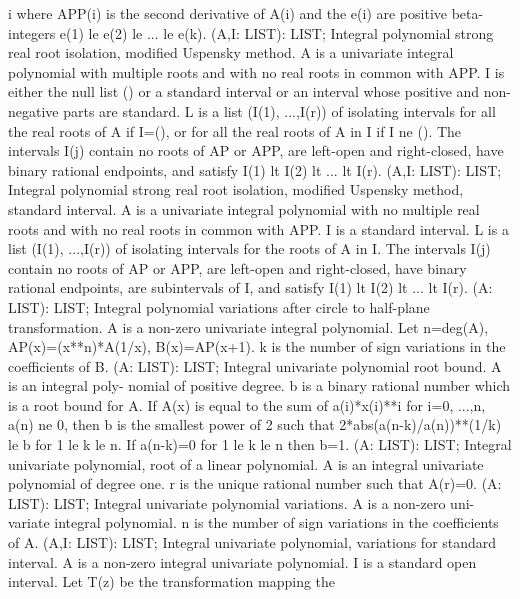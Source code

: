 i where APP(i) is the second derivative of A(i) and the e(i) are
positive beta-integers e(1) le e(2) le ... le e(k). \ecom 
{} (A,I: LIST): LIST; \eproc
\bcom Integral polynomial strong real root isolation, modified Uspensky method.
A is a univariate integral polynomial with multiple roots and
with no real roots in common with APP.  I is either the null list () or
a standard interval or an interval whose positive and non-negative
parts are standard.  L is a list (I(1), ...,I(r)) of isolating intervals
for  all the real roots of A if I=(), or for all the real roots of A in
I if I ne ().  The intervals I(j) contain no roots of AP or APP, are
left-open and right-closed, have binary rational endpoints, and
satisfy I(1) lt I(2) lt ... lt I(r). \ecom 
{} (A,I: LIST): LIST; \eproc
\bcom Integral polynomial strong real root isolation, modified Uspensky method, standard interval.
A is a univariate integral polynomial with no multiple real roots 
and with no real roots in common with APP.  I is
a standard interval.  L is a list (I(1), ...,I(r)) of isolating
intervals for the roots of A in I.  The intervals I(j) contain no
roots of AP or APP, are left-open and right-closed, have binary rational
endpoints, are subintervals of I, and satisfy I(1) lt I(2) lt  ...
lt I(r). \ecom 
{} (A: LIST): LIST; \eproc
\bcom Integral polynomial variations after circle to half-plane transformation.
A is a non-zero univariate integral polynomial.  Let
n=deg(A), AP(x)=(x**n)*A(1/x), B(x)=AP(x+1).  k is the number of
sign variations in the coefficients of B. \ecom 
{} (A: LIST): LIST; \eproc
\bcom Integral univariate polynomial root bound. A is an integral poly-
nomial of positive degree.  b is a binary rational number which is a
root bound for A.  If A(x) is equal to the sum of a(i)*x(i)**i for
i=0, ...,n, a(n) ne 0, then b is the smallest power of 2 such that
2*abs(a(n-k)/a(n))**(1/k) le b for 1 le k le n.  If
a(n-k)=0 for 1 le k le n then b=1. \ecom 
{} (A: LIST): LIST; \eproc
\bcom Integral univariate polynomial, root of a linear polynomial.
A is an integral univariate polynomial of degree one.  r is
the unique rational number such that A(r)=0. \ecom 
{} (A: LIST): LIST; \eproc
\bcom Integral univariate polynomial variations. A is a non-zero uni-
variate integral polynomial.  n is the number of sign variations in
the coefficients of A. \ecom 
{} (A,I: LIST): LIST; \eproc
\bcom Integral univariate polynomial, variations for standard interval.
A is a non-zero integral univariate polynomial.  I is
a standard open interval.  Let T(z) be the transformation mapping the
